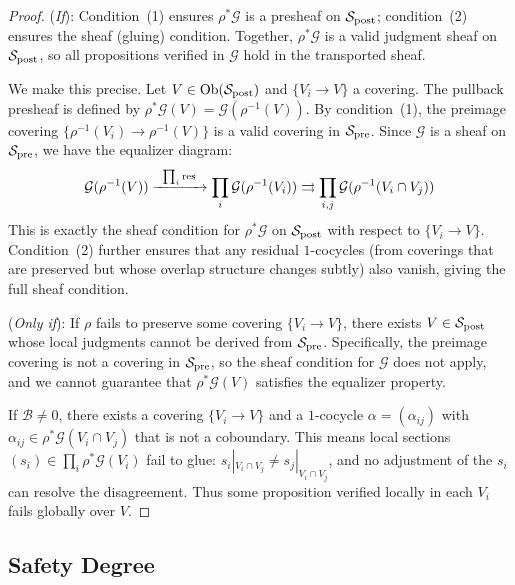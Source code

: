 \documentclass[11pt]{article}
\newcommand{\SitePre}{\Site_{\mathrm{pre}}}
\newcommand{\SitePost}{\Site_{\mathrm{post}}}
\newcommand{\RefactorMorph}{\rho}
\newcommand{\ObstructionSheaf}{\mathcal{B}}
\begin{document}
\begin{proof}
(\emph{If}): Condition~(1) ensures $\RefactorMorph^{*}\mathcal{G}$ is a
presheaf on $\SitePost$; condition~(2) ensures the sheaf (gluing)
condition.  Together, $\RefactorMorph^{*}\mathcal{G}$ is a valid
judgment sheaf on $\SitePost$, so all propositions verified in
$\mathcal{G}$ hold in the transported sheaf.

We make this precise.  Let $V \in \Ob(\SitePost)$ and
$\{V_i \to V\}$ a covering.  The pullback presheaf is defined by
$\RefactorMorph^*\mathcal{G}(V) = \mathcal{G}(\RefactorMorph^{-1}(V))$.
By condition~(1), the preimage covering
$\{\RefactorMorph^{-1}(V_i) \to \RefactorMorph^{-1}(V)\}$ is a valid
covering in $\SitePre$.  Since $\mathcal{G}$ is a sheaf on $\SitePre$,
we have the equalizer diagram:
\[
  \mathcal{G}(\RefactorMorph^{-1}(V))
  \xrightarrow{\;\;\prod_i \res\;\;}
  \prod_i \mathcal{G}(\RefactorMorph^{-1}(V_i))
  \rightrightarrows
  \prod_{i,j} \mathcal{G}(\RefactorMorph^{-1}(V_i \cap V_j))
\]
This is exactly the sheaf condition for $\RefactorMorph^*\mathcal{G}$
on $\SitePost$ with respect to $\{V_i \to V\}$.  Condition~(2) further
ensures that any residual $1$-cocycles (from coverings that are
preserved but whose overlap structure changes subtly) also vanish,
giving the full sheaf condition.

(\emph{Only if}): If $\RefactorMorph$ fails to preserve some covering
$\{V_i \to V\}$, there exists $V \in \SitePost$ whose local judgments
cannot be derived from $\SitePre$.  Specifically, the preimage covering
is not a covering in $\SitePre$, so the sheaf condition for
$\mathcal{G}$ does not apply, and we cannot guarantee that
$\RefactorMorph^*\mathcal{G}(V)$ satisfies the equalizer property.

If $\ObstructionSheaf \neq 0$, there exists a covering $\{V_i \to V\}$
and a $1$-cocycle $\alpha = (\alpha_{ij})$ with
$\alpha_{ij} \in \RefactorMorph^*\mathcal{G}(V_i \cap V_j)$ that is
not a coboundary.  This means local sections
$(s_i) \in \prod_i \RefactorMorph^*\mathcal{G}(V_i)$ fail to glue:
$s_i|_{V_i \cap V_j} \neq s_j|_{V_i \cap V_j}$, and no adjustment of
the $s_i$ can resolve the disagreement.  Thus some proposition verified
locally in each $V_i$ fails globally over $V$.
\end{proof}

\subsection{Safety Degree}\label{ssec:safety-degree}
\end{document}
